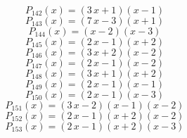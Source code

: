 \subitem \begin{dmath*}P_{142}(x) = {\left(3 \, x + 1\right)} {\left(x - 1\right)} \end{dmath*}\vspace{-1.2cm}
\subitem \begin{dmath*}P_{143}(x) = {\left(7 \, x - 3\right)} {\left(x + 1\right)} \end{dmath*}\vspace{-1.2cm}
\subitem \begin{dmath*}P_{144}(x) = {\left(x - 2\right)} {\left(x - 3\right)} \end{dmath*}\vspace{-1.2cm}
\subitem \begin{dmath*}P_{145}(x) = {\left(2 \, x - 1\right)} {\left(x + 2\right)} \end{dmath*}\vspace{-1.2cm}
\subitem \begin{dmath*}P_{146}(x) = {\left(3 \, x + 2\right)} {\left(x - 2\right)} \end{dmath*}\vspace{-1.2cm}
\subitem \begin{dmath*}P_{147}(x) = {\left(2 \, x - 1\right)} {\left(x - 2\right)} \end{dmath*}\vspace{-1.2cm}
\subitem \begin{dmath*}P_{148}(x) = {\left(3 \, x + 1\right)} {\left(x + 2\right)} \end{dmath*}\vspace{-1.2cm}
\subitem \begin{dmath*}P_{149}(x) = {\left(2 \, x - 1\right)} {\left(x - 1\right)} \end{dmath*}\vspace{-1.2cm}
\subitem \begin{dmath*}P_{150}(x) = {\left(2 \, x - 1\right)} {\left(x - 3\right)} \end{dmath*}\vspace{-1.2cm}
\subitem \begin{dmath*}P_{151}(x) = {\left(3 \, x - 2\right)} {\left(x - 1\right)} {\left(x - 2\right)} \end{dmath*}\vspace{-1.2cm}
\subitem \begin{dmath*}P_{152}(x) = {\left(2 \, x - 1\right)} {\left(x + 2\right)} {\left(x - 2\right)} \end{dmath*}\vspace{-1.2cm}
\subitem \begin{dmath*}P_{153}(x) = {\left(2 \, x - 1\right)} {\left(x + 2\right)} {\left(x - 3\right)} \end{dmath*}\vspace{-1.2cm}
